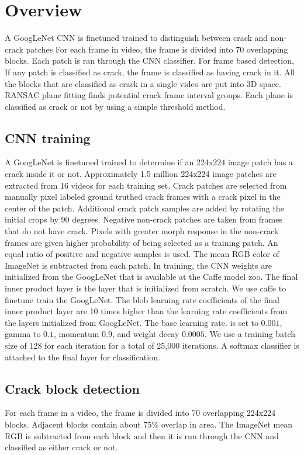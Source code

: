 \section{Overview}

A GoogLeNet CNN is finetuned trained to distinguish between crack and non-crack patches
For each frame in video, the frame is  divided into 70 overlapping blocks. Each patch is ran through the CNN classifier. For frame based detection, If any patch is classified as crack, the frame is classified as having crack in it.
All the blocks that are classified as crack in a single video are put into 3D space. RANSAC plane fitting finds potential crack frame interval groups.
Each plane is classified as crack or not by using a simple threshold method. 


\subsection{CNN training}
           A GoogLeNet is finetuned trained to determine if an 224x224 image patch has a crack inside it or not. Approximately 1.5 million 224x224 image patches are extracted from 16 videos for each training set. Crack patches are selected from manually pixel labeled ground truthed crack frames with a crack pixel in the center of the patch. Additional crack patch samples are added by rotating the initial crops by 90 degrees.  Negative non-crack patches are taken from frames that do not have crack. Pixels with greater morph response in the non-crack frames are given higher probability of being selected as a training patch. An equal ratio of positive and negative samples is used. The mean RGB color of ImageNet is subtracted from each patch.
           In training, the CNN weights are initialized from the GoogLeNet that is available at the Caffe model zoo. The final inner product layer is the layer that is initialized from scratch. We use caffe \cite{caffe} to finetune train the GoogLeNet.  The blob learning rate coefficients of the final inner product layer are 10 times higher than the learning rate coefficients from the layers initialized from GoogLeNet.  The base learning rate. is set to  $0.001$,   gamma to $0.1$, momentum $0.9$, and weight decay $0.0005$.  We use a training batch size of 128 for each iteration for a total of 25,000 iterations.  A softmax classifier is attached to the final layer for classification.
            
\subsection{Crack block detection}
            For each frame in a video, the frame is divided into 70 overlapping 224x224 blocks. Adjacent blocks contain about 75\% overlap in area. The ImageNet mean RGB is subtracted from each block and then it is run through the CNN and classified as either crack or not.

